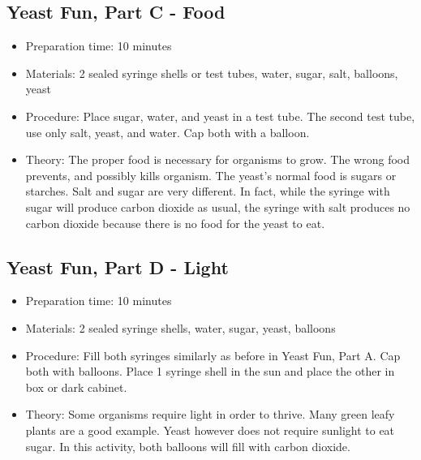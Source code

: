 \subsection{Yeast Fun, Part C - Food}
\begin{itemize}
\item{Preparation time: 10 minutes}
\item{Materials: 2 sealed syringe shells or test tubes, water, sugar, salt, balloons, yeast}
\item{Procedure: Place sugar, water, and yeast in a test tube. The second test tube, use only salt, yeast, and water. Cap both with a balloon.}
\item{Theory: The proper food is necessary for organisms to grow. The wrong food prevents, and possibly kills organism. The yeast’s normal food is sugars or starches. Salt and sugar are very different. In fact, while the syringe with sugar will produce carbon dioxide as usual, the syringe with salt produces no carbon dioxide because there is no food for the yeast to eat.}
\end{itemize}


\subsection{Yeast Fun, Part D - Light}
\begin{itemize}
\item{Preparation time: 10 minutes}
\item{Materials: 2 sealed syringe shells, water, sugar, yeast, balloons}
\item{Procedure: Fill both syringes similarly as before in Yeast Fun, Part A. Cap both with balloons. Place 1 syringe shell in the sun and place the other in box or dark cabinet.}
\item{Theory: Some organisms require light in order to thrive. Many green leafy plants are a good example. Yeast however does not require sunlight to eat sugar. In this activity, both balloons will fill with carbon dioxide.}
\end{itemize}


